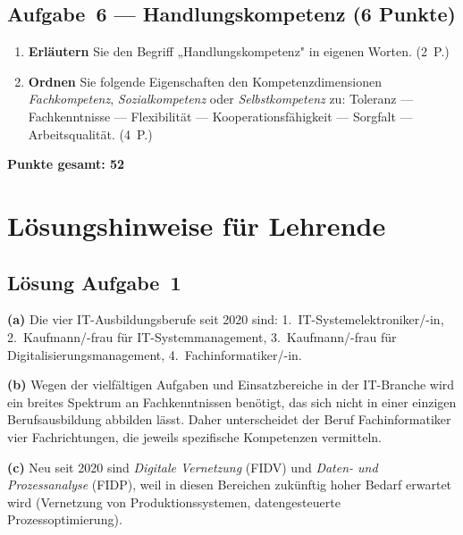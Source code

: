 \documentclass[11pt, a4paper]{article}
\begin{document}
\subsection*{Aufgabe~6 --- Handlungskompetenz (6 Punkte)}

\begin{enumerate}[label=(\alph*)]
  \item \textbf{Erläutern} Sie den Begriff „Handlungskompetenz" in eigenen Worten. \hfill (2~P.)

  \vspace{3cm}

  \item \textbf{Ordnen} Sie folgende Eigenschaften den Kompetenzdimensionen \textit{Fachkompetenz}, \textit{Sozialkompetenz} oder \textit{Selbstkompetenz} zu: Toleranz --- Fachkenntnisse --- Flexibilität --- Kooperationsfähigkeit --- Sorgfalt --- Arbeitsqualität. \hfill (4~P.)

  \vspace{3cm}
\end{enumerate}

\vspace{1em}
\noindent\textbf{Punkte gesamt: 52}

\newpage
\section*{Lösungshinweise für Lehrende}\label{loesungen}

\subsection*{Lösung Aufgabe~1}
\begin{loesung}
\textbf{(a)} Die vier IT-Ausbildungsberufe seit 2020 sind:
1.~IT-Systemelektroniker/-in, 2.~Kaufmann/-frau für IT-Systemmanagement,
3.~Kaufmann/-frau für Digitalisierungsmanagement, 4.~Fachinformatiker/-in.

\textbf{(b)} Wegen der vielfältigen Aufgaben und Einsatzbereiche in der IT-Branche wird ein
breites Spektrum an Fachkenntnissen benötigt, das sich nicht in einer einzigen
Berufsausbildung abbilden lässt. Daher unterscheidet der Beruf Fachinformatiker vier
Fachrichtungen, die jeweils spezifische Kompetenzen vermitteln.

\textbf{(c)} Neu seit 2020 sind \emph{Digitale Vernetzung} (FIDV) und \emph{Daten- und
Prozessanalyse} (FIDP), weil in diesen Bereichen zukünftig hoher Bedarf erwartet wird
(Vernetzung von Produktionssystemen, datengesteuerte Prozessoptimierung).
\end{loesung}
\end{document}
